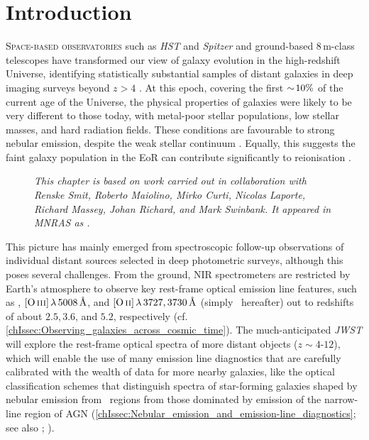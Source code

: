     \fancyhf{}
    \fancyfoot[C]{\color{white}\thepage}
    \newpage
    \setFancyHdr
\fi

\section{Introduction}
\label{chAsec:Introduction}

\lettrine{S}{pace-based observatories} such as \textit{HST} and \textit{Spitzer} and ground-based $8 \, \mathrm{m}$-class telescopes have transformed our view of galaxy evolution in the high-redshift Universe, identifying statistically substantial samples of distant galaxies in deep imaging surveys beyond $z>4$ \citep{2014ARA&A..52..415M}. At this epoch, covering the first $\sim \! 10\%$ of the current age of the Universe, the physical properties of galaxies were likely to be very different to those today, with metal-poor stellar populations, low stellar masses, and hard radiation fields. These conditions are favourable to strong nebular emission, despite the weak stellar continuum \citep[e.g.][]{2016ARA&A..54..761S}. Equally, this suggests the faint galaxy population in the EoR can contribute significantly to reionisation \citep[e.g.][]{2015ApJ...803...34B}.
\begin{figure}
    \begin{mdframed}[backgroundcolor=black!2.5]
        \textsl{This chapter is based on work carried out in collaboration with Renske Smit, Roberto Maiolino, Mirko Curti, Nicolas Laporte, Richard Massey, Johan Richard, and Mark Swinbank. It appeared in MNRAS as \citet*{2021MNRAS.508.1686W}.}
    \end{mdframed}
\end{figure}

This picture has mainly emerged from spectroscopic follow-up observations of individual distant sources selected in deep photometric surveys, although this poses several challenges. From the ground, NIR spectrometers are restricted by Earth's atmosphere to observe key rest-frame optical emission line features, such as \Halpha, $\OIIIf \, \lambda \, 5008 \, \Angstrom$, and $\OII \, \lambda \, 3727, 3730 \, \Angstrom$ (simply \OII\ hereafter) out to redshifts of about $2.5, 3.6$, and $5.2$, respectively (cf. \cref{chIssec:Observing_galaxies_across_cosmic_time}). The much-anticipated \textit{JWST} will explore the rest-frame optical spectra of more distant objects ($z \sim 4$-$12$), which will enable the use of many emission line diagnostics that are carefully calibrated with the wealth of data for more nearby galaxies, like the optical classification schemes that distinguish spectra of star-forming galaxies shaped by nebular emission from \HII\ regions from those dominated by emission of the narrow-line region of AGN (\cref{chIssec:Nebular_emission_and_emission-line_diagnostics}; see also ; \citealt{1987ApJS...63..295V}).

